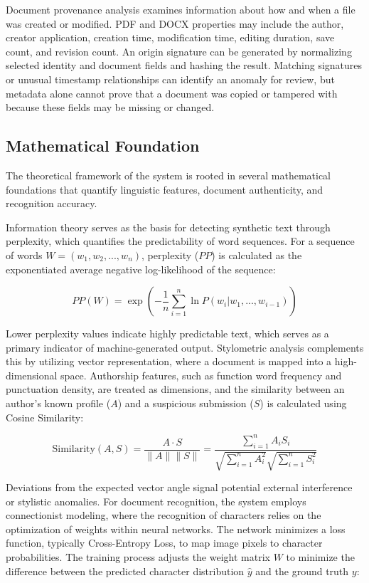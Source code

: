 \documentclass[12pt, a4paper]{report}
\numberwithin{equation}{chapter}
\begin{document}
Document provenance analysis examines information about how and when a file was created or modified. PDF and DOCX properties may include the author, creator application, creation time, modification time, editing duration, save count, and revision count. An origin signature can be generated by normalizing selected identity and document fields and hashing the result. Matching signatures or unusual timestamp relationships can identify an anomaly for review, but metadata alone cannot prove that a document was copied or tampered with because these fields may be missing or changed.

\subsection{Mathematical Foundation}
The theoretical framework of the system is rooted in several mathematical foundations that quantify linguistic features, document authenticity, and recognition accuracy. 

Information theory serves as the basis for detecting synthetic text through perplexity, which quantifies the predictability of word sequences. For a sequence of words $W = (w_1, w_2, ..., w_n)$, perplexity ($PP$) is calculated as the exponentiated average negative log-likelihood of the sequence:

\begin{equation}
PP(W) = \exp\left( -\frac{1}{n} \sum_{i=1}^{n} \ln P(w_i | w_1, ..., w_{i-1}) \right)
\label{eq:perplexity}
\end{equation}

Lower perplexity values indicate highly predictable text, which serves as a primary indicator of machine-generated output. Stylometric analysis complements this by utilizing vector representation, where a document is mapped into a high-dimensional space. Authorship features, such as function word frequency and punctuation density, are treated as dimensions, and the similarity between an author's known profile ($A$) and a suspicious submission ($S$) is calculated using Cosine Similarity:

\begin{equation}
\text{Similarity}(A, S) = \frac{A \cdot S}{\|A\| \|S\|} = \frac{\sum_{i=1}^{n} A_i S_i}{\sqrt{\sum_{i=1}^{n} A_i^2} \sqrt{\sum_{i=1}^{n} S_i^2}}
\label{eq:cosine_similarity}
\end{equation}

Deviations from the expected vector angle signal potential external interference or stylistic anomalies. For document recognition, the system employs connectionist modeling, where the recognition of characters relies on the optimization of weights within neural networks. The network minimizes a loss function, typically Cross-Entropy Loss, to map image pixels to character probabilities. The training process adjusts the weight matrix $W$ to minimize the difference between the predicted character distribution $\hat{y}$ and the ground truth $y$:
\end{document}
